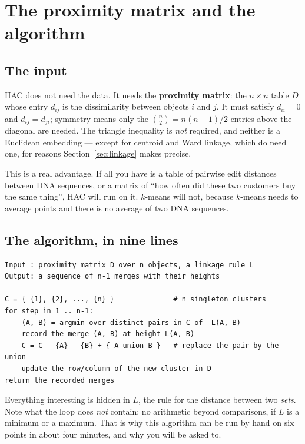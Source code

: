 \documentclass[11pt]{article}
\begin{document}
\section{The proximity matrix and the algorithm}
\label{sec:hac}

\subsection{The input}

HAC does not need the data. It needs the \textbf{proximity matrix}: the
$n \times n$ table $D$ whose entry $d_{ij}$ is the dissimilarity between
objects $i$ and $j$. It must satisfy $d_{ii} = 0$ and $d_{ij} = d_{ji}$;
symmetry means only the $\binom{n}{2} = n(n-1)/2$ entries above the diagonal
are needed. The triangle inequality is \emph{not} required, and neither is a
Euclidean embedding --- except for centroid and Ward linkage, which do need
one, for reasons Section~\ref{sec:linkage} makes precise.

This is a real advantage. If all you have is a table of pairwise edit
distances between DNA sequences, or a matrix of ``how often did these two
customers buy the same thing'', HAC will run on it. $k$-means will not,
because $k$-means needs to average points and there is no average of two DNA
sequences.

\subsection{The algorithm, in nine lines}

\begin{lstlisting}
Input : proximity matrix D over n objects, a linkage rule L
Output: a sequence of n-1 merges with their heights

C = { {1}, {2}, ..., {n} }              # n singleton clusters
for step in 1 .. n-1:
    (A, B) = argmin over distinct pairs in C of  L(A, B)
    record the merge (A, B) at height L(A, B)
    C = C - {A} - {B} + { A union B }   # replace the pair by the union
    update the row/column of the new cluster in D
return the recorded merges
\end{lstlisting}

Everything interesting is hidden in $L$, the rule for the distance between two
\emph{sets}. Note what the loop does \emph{not} contain: no arithmetic beyond
comparisons, if $L$ is a minimum or a maximum. That is why this algorithm can
be run by hand on six points in about four minutes, and why you will be asked
to.
\end{document}
